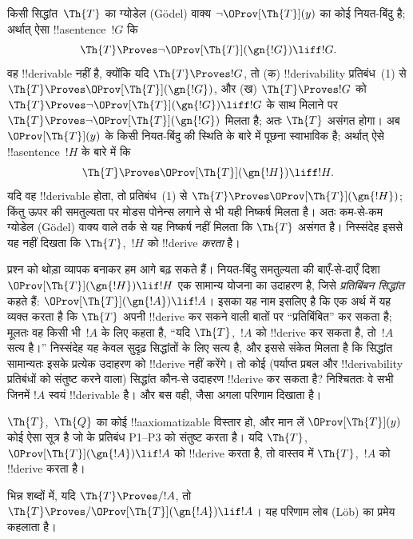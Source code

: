 \documentclass[../../../include/open-logic-section]{subfiles}
\begin{document}


किसी सिद्धांत~$\Th{T}$ का ग्योडेल (G\"odel) वाक्य
$\lnot \OProv[\Th{T}](y)$ का कोई नियत-बिंदु है; अर्थात् ऐसा
!!a{sentence}~$!G$ कि
\[
\Th{T} \Proves \lnot \OProv[\Th{T}](\gn{!G}) \liff !G.
\]
वह !!{derivable} नहीं है, क्योंकि यदि $\Th{T} \Proves !G$, तो (क)
!!{derivability} प्रतिबंध~(1) से
$\Th{T} \Proves \OProv[\Th{T}](\gn{!G})$, और (ख)
$\Th{T} \Proves !G$ को
$\Th{T} \Proves \lnot \OProv[\Th{T}](\gn{!G}) \liff !G$ के साथ मिलाने
पर $\Th{T} \Proves \lnot \OProv[\Th{T}](\gn{!G})$ मिलता है; अतः
$\Th{T}$ असंगत होगा। अब $\OProv[\Th{T}](y)$ के किसी नियत-बिंदु की स्थिति
के बारे में पूछना स्वाभाविक है; अर्थात् ऐसे !!a{sentence}~$!H$ के बारे में
कि
\[
\Th{T} \Proves \OProv[\Th{T}](\gn{!H}) \liff !H.
\]
यदि वह !!{derivable} होता, तो प्रतिबंध~(1) से
$\Th{T} \Proves \OProv[\Th{T}](\gn{!H})$; किंतु ऊपर की समतुल्यता पर मोडस
पोनेन्स लगाने से भी यही निष्कर्ष मिलता है। अतः कम-से-कम ग्योडेल (G\"odel) वाक्य वाले
तर्क से यह निष्कर्ष नहीं मिलता कि $\Th{T}$ असंगत है। निस्संदेह इससे यह
नहीं दिखता कि $\Th{T}$,~$!H$ को !!{derive} \emph{करता} है।

प्रश्न को थोड़ा व्यापक बनाकर हम आगे बढ़ सकते हैं। नियत-बिंदु समतुल्यता की
बाएँ-से-दाएँ दिशा $\OProv[\Th{T}](\gn{!H}) \lif !H$ एक सामान्य योजना का
उदाहरण है, जिसे \emph{प्रतिबिंबन सिद्धांत} कहते हैं:
$\OProv[\Th{T}](\gn{!A}) \lif !A$। इसका यह नाम इसलिए है कि एक अर्थ में यह
व्यक्त करता है कि $\Th{T}$ अपनी !!{derive} कर सकने वाली बातों पर
``प्रतिबिंबित'' कर सकता है; मूलतः वह किसी भी~$!A$ के लिए कहता है, ``यदि
$\Th{T}$,~$!A$ को !!{derive} कर सकता है, तो~$!A$ सत्य है।'' निस्संदेह यह
केवल सुदृढ़ सिद्धांतों के लिए सत्य है, और इससे संकेत मिलता है कि सिद्धांत
सामान्यतः इसके प्रत्येक उदाहरण को !!{derive} नहीं करेंगे। तो कोई
(पर्याप्त प्रबल और !!{derivability} प्रतिबंधों को संतुष्ट करने वाला)
सिद्धांत कौन-से उदाहरण !!{derive} कर सकता है? निश्चिततः वे सभी जिनमें
$!A$ स्वयं !!{derivable} है। और बस वही, जैसा अगला परिणाम दिखाता है।

\begin{thm}
$\Th{T}$,~$\Th{Q}$ का कोई !!a{axiomatizable} विस्तार हो, और मान लें
$\OProv[\Th{T}](y)$ कोई ऐसा सूत्र है जो  के प्रतिबंध
P1--P3 को संतुष्ट करता है। यदि $\Th{T}$,
$\OProv[\Th{T}](\gn{!A}) \lif !A$ को !!{derive} करता है, तो वास्तव में
$\Th{T}$,~$!A$ को !!{derive} करता है।
\end{thm}

भिन्न शब्दों में, यदि $\Th{T} \Proves/ !A$, तो
$\Th{T} \Proves/ \OProv[\Th{T}](\gn{!A}) \lif !A$। यह परिणाम लोब (L\"ob)
 का प्रमेय कहलाता है।
\end{document}
